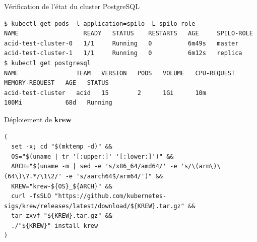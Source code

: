 
\begin{frame}[fragile]{Vérification de l'état du cluster PostgreSQL}

\begin{tiny}
\begin{Verbatim}[commandchars=\&\{\}]
$ kubectl get pods -l application=spilo -L spilo-role
NAME                  READY   STATUS    RESTARTS   AGE     SPILO-ROLE
acid-test-cluster-0   1/1     Running   0          6m49s   master
acid-test-cluster-1   1/1     Running   0          6m12s   replica
$ kubectl get postgresql
NAME                TEAM   VERSION   PODS   VOLUME   CPU-REQUEST   MEMORY-REQUEST   AGE   STATUS
acid-test-cluster   acid   15        2      1Gi      10m           100Mi            68d   Running
\end{Verbatim}
\end{tiny}

\end{frame}


\begin{frame}[fragile]{Déploiement de \textbf{krew}}

\begin{tiny}
\begin{Verbatim}[commandchars=\&\#\#]
(
  set -x; cd "$(mktemp -d)" &&
  OS="$(uname | tr '[:upper:]' '[:lower:]')" &&
  ARCH="$(uname -m | sed -e 's/x86_64/amd64/' -e 's/\(arm\)\(64\)\?.*/\1\2/' -e 's/aarch64$/arm64/')" &&
  KREW="krew-${OS}_${ARCH}" &&
  curl -fsSLO "https://github.com/kubernetes-sigs/krew/releases/latest/download/${KREW}.tar.gz" &&
  tar zxvf "${KREW}.tar.gz" &&
  ./"${KREW}" install krew
)
\end{Verbatim}
\end{tiny}

\end{frame}


